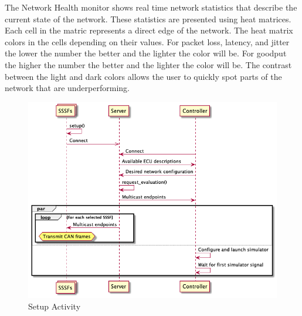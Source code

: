 \documentclass[letterpaper,twocolumn,12pt]{article}
\begin{document}
The Network Health monitor shows real time network statistics that describe the current state of the network. These statistics are presented using heat matrices. Each cell in the matric represents a direct edge of the network. The heat matrix colors in the cells depending on their values. For packet loss, latency, and jitter the lower the number the better and the lighter the color will be. For goodput the higher the number the better and the lighter the color will be. The contrast between the light and dark colors allows the user to quickly spot parts of the network that are underperforming.

\begin{figure}[t!]
    \centering
    \includegraphics[width=\linewidth]{out/images/connection_setup/connection_setup.png}
    \caption{Setup Activity}
    \label{fig:setup_activity}
\end{figure}
\end{document}
